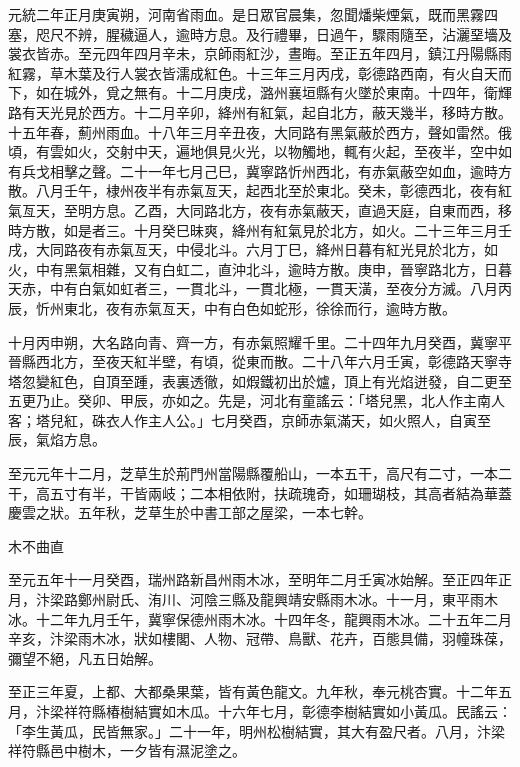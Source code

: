 \begin{pinyinscope}
 元統二年正月庚寅朔，河南省雨血。是日眾官晨集，忽聞燔柴煙氣，既而黑霧四塞，咫尺不辨，腥穢逼人，逾時方息。及行禮畢，日過午，驟雨隨至，沾灑堊墻及裳衣皆赤。至元四年四月辛未，京師雨紅沙，晝晦。至正五年四月，鎮江丹陽縣雨紅霧，草木葉及行人裳衣皆濡成紅色。十三年三月丙戌，彰德路西南，有火自天而下，如在城外，覓之無有。十二月庚戌，潞州襄垣縣有火墜於東南。十四年，衛輝路有天光見於西方。十二月辛卯，絳州有紅氣，起自北方，蔽天幾半，移時方散。十五年春，薊州雨血。十八年三月辛丑夜，大同路有黑氣蔽於西方，聲如雷然。俄頃，有雲如火，交射中天，遍地俱見火光，以物觸地，輒有火起，至夜半，空中如有兵戈相擊之聲。二十一年七月己巳，冀寧路忻州西北，有赤氣蔽空如血，逾時方散。八月壬午，棣州夜半有赤氣亙天，起西北至於東北。癸未，彰德西北，夜有紅氣亙天，至明方息。乙酉，大同路北方，夜有赤氣蔽天，直過天庭，自東而西，移時方散，如是者三。十月癸巳昧爽，絳州有紅氣見於北方，如火。二十三年三月壬戌，大同路夜有赤氣亙天，中侵北斗。六月丁巳，絳州日暮有紅光見於北方，如火，中有黑氣相雜，又有白虹二，直沖北斗，逾時方散。庚申，晉寧路北方，日暮天赤，中有白氣如虹者三，一貫北斗，一貫北極，一貫天潢，至夜分方滅。八月丙辰，忻州東北，夜有赤氣亙天，中有白色如蛇形，徐徐而行，逾時方散。



 十月丙申朔，大名路向青、齊一方，有赤氣照耀千里。二十四年九月癸酉，冀寧平晉縣西北方，至夜天紅半壁，有頃，從東而散。二十八年六月壬寅，彰德路天寧寺塔忽變紅色，自頂至踵，表裏透徹，如煆鐵初出於爐，頂上有光焰迸發，自二更至五更乃止。癸卯、甲辰，亦如之。先是，河北有童謠云：「塔兒黑，北人作主南人客；塔兒紅，硃衣人作主人公。」七月癸酉，京師赤氣滿天，如火照人，自寅至辰，氣焰方息。



 至元元年十二月，芝草生於荊門州當陽縣覆船山，一本五干，高尺有二寸，一本二干，高五寸有半，干皆兩岐；二本相依附，扶疏瑰奇，如珊瑚枝，其高者結為華蓋慶雲之狀。五年秋，芝草生於中書工部之屋梁，一本七幹。



 木不曲直



 至元五年十一月癸酉，瑞州路新昌州雨木冰，至明年二月壬寅冰始解。至正四年正月，汴梁路鄭州尉氏、洧川、河陰三縣及龍興靖安縣雨木冰。十一月，東平雨木冰。十二年九月壬午，冀寧保德州雨木冰。十四年冬，龍興雨木冰。二十五年二月辛亥，汴梁雨木冰，狀如樓閣、人物、冠帶、鳥獸、花卉，百態具備，羽幢珠葆，彌望不絕，凡五日始解。



 至正三年夏，上都、大都桑果葉，皆有黃色龍文。九年秋，奉元桃杏實。十二年五月，汴梁祥符縣椿樹結實如木瓜。十六年七月，彰德李樹結實如小黃瓜。民謠云：「李生黃瓜，民皆無家。」二十一年，明州松樹結實，其大有盈尺者。八月，汴梁祥符縣邑中樹木，一夕皆有濕泥塗之。




\end{pinyinscope}
